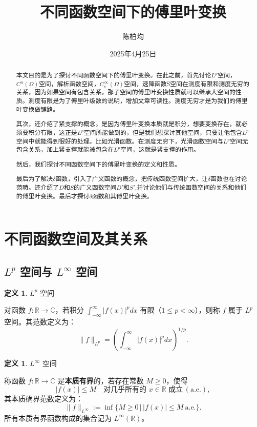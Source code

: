 \documentclass[12pt,a4paper]{article}
\title{不同函数空间下的傅里叶变换}
\author{陈柏均}
\date{2025年4月25日}
\theoremstyle{plain}
\theoremstyle{definition}
\newtheorem{definition}[theorem]{定义}
\theoremstyle{remark}
\begin{document}
	\maketitle
		\begin{abstract}
		本文目的是为了探讨不同函数空间下的傅里叶变换。在此之前，首先讨论$L^p$空间，$C^n(\Omega)$空间，解析函数空间，$C_c^\infty(\Omega)$空间，速降函数S空间在测度有限和测度无穷的关系，因为如果空间有包含关系，那子空间的傅里叶变换性质就可以继承大空间的性质。测度有限是为了傅里叶级数的说明，增加文章可读性。测度无穷才是为我们的傅里叶变换做铺路。
		
		其次，还介绍了紧支撑的概念。是因为傅里叶变换本质就是积分，想要变换存在，就必须要积分有限，这正是$L^p$空间所能做到的，但是我们想探讨其他空间，只要让他包含$L^p$空间中就能得到很好的处理。比如光滑函数。在测度无穷下，光滑函数空间与$L^p$空间无包含关系，加上紧支撑就能被包含在$L^p$空间，这就是紧支撑的作用。
		
		然后，我们探讨不同函数空间下的傅里叶变换的定义和性质。
		
	    最后为了解决$\delta$函数，引入了广义函数的概念，把传统函数空间扩大，让$\delta$函数也在讨论范畴。还介绍了$D$和$S$的广义函数空间$D'$和$S'$,并讨论他们与传统函数空间的关系和他们的傅里叶变换。最后才探讨$\delta$函数和其傅里叶变换。
	\end{abstract}
	\newpage
	
		\tableofcontents
	\clearpage
	
	
	\section{不同函数空间及其关系}
	\subsection{\texorpdfstring{$L^p$}{Lp} 空间与 \texorpdfstring{$L^\infty$}{L∞} 空间}
	
	\begin{definition}$L^p$ 空间
		
		对函数 $f: \mathbb{R} \to \mathbb{C}$，若积分 $\int_{-\infty}^\infty |f(x)|^p dx$ 有限（$1 \leq p < \infty$），则称 $f$ 属于 $L^p$ 空间。其范数定义为：
		\[
		\|f\|_{L^p} = \left( \int_{-\infty}^\infty |f(x)|^p dx \right)^{1/p}.
		\]
	\end{definition}
	
\begin{definition}$L^\infty$ 空间
	
	称函数 $f: \mathbb{R} \to \mathbb{C}$ 是\textbf{本质有界}的，若存在常数 $M \geq 0$，使得
	\[
	|f(x)| \leq M \quad \text{对几乎所有的 } x \in \mathbb{R} \text{ 成立} \, (\text{a.e.}),
	\]
	其本质确界范数定义为：
	\[
	\|f\|_{L^\infty} := \inf \big\{ M \geq 0 \,\big|\, |f(x)| \leq M \ \text{a.e.} \big\}.
	\]
	所有本质有界函数构成的集合记为 $L^\infty(\mathbb{R})$。
\end{definition}
	
\end{document}
